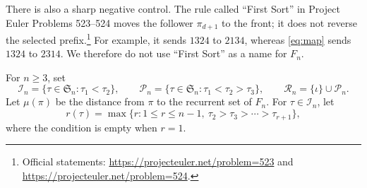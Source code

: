 \documentclass[a4paper,10pt]{amsart}
\theoremstyle{remark}
\newcommand{\Sn}{\mathfrak S_n}
\newcommand{\cI}{\mathcal I}
\newcommand{\cP}{\mathcal P}
\newcommand{\cR}{\mathcal R}
\begin{document}
There is also a sharp negative control.  The rule called ``First Sort'' in
Project Euler Problems 523--524 moves the follower $\pi_{d+1}$ to the front;
it does not reverse the selected prefix.\footnote{Official statements:
\url{https://projecteuler.net/problem=523} and
\url{https://projecteuler.net/problem=524}.}
For example, it sends $1324$ to $2134$, whereas \eqref{eq:map} sends $1324$
to $2314$.  We therefore do not use ``First Sort'' as a name for $F_n$.

For $n\ge3$, set
\begin{equation}\label{eq:sets}
 \cI_n=\{\tau\in\Sn:\tau_1<\tau_2\},\qquad
 \cP_n=\{\tau\in\Sn:\tau_1<\tau_2>\tau_3\},\qquad
 \cR_n=\{\iota\}\cup\cP_n.
\end{equation}
Let $\mu(\pi)$ be the distance from $\pi$ to the recurrent set of $F_n$.
For $\tau\in\cI_n$, let
\begin{equation}\label{eq:run}
 r(\tau)=\max\{r:1\le r\le n-1,
                  \ \tau_2>\tau_3>\cdots>\tau_{r+1}\},
\end{equation}
where the condition is empty when $r=1$.
\end{document}
